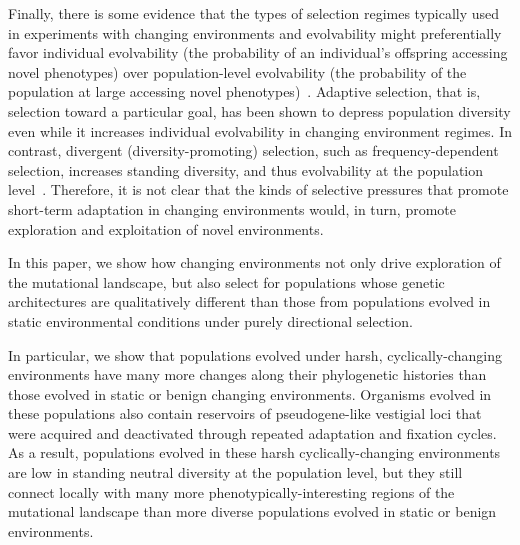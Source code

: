 \documentclass[10pt,letterpaper,final]{article}
\begin{document}
Finally, there is some evidence that the types of selection regimes typically used in experiments with changing environments and evolvability might preferentially favor individual evolvability (the probability of an individual's offspring accessing novel phenotypes) over population-level evolvability (the probability of the population at large accessing novel phenotypes)~\cite{wilder_reconciling_2015,lehman_critical_2016}. Adaptive selection, that is, selection toward a particular goal, has been shown to depress population diversity even while it increases individual evolvability in changing environment regimes. In contrast, divergent (diversity-promoting) selection, such as frequency-dependent selection, increases standing diversity, and thus evolvability at the population level~\cite{wilder_reconciling_2015}. Therefore, it is not clear that the kinds of selective pressures that promote short-term adaptation in changing environments would, in turn, promote exploration and exploitation of novel environments.




In this paper, we show how changing environments not only drive exploration of the mutational landscape, but also select for populations whose genetic architectures are qualitatively different than those from populations evolved in static environmental conditions under purely directional selection. 

In particular, we show that populations evolved under harsh, cyclically-changing environments have many more changes along their phylogenetic histories than those evolved in static or benign changing environments. Organisms evolved in these populations also contain reservoirs of pseudogene-like vestigial loci that were acquired and deactivated through repeated adaptation and fixation cycles. As a result, populations evolved in these harsh cyclically-changing environments are low in standing neutral diversity at the population level, but they still connect locally with many more phenotypically-interesting regions of the mutational landscape than more diverse populations evolved in static or benign environments.
\end{document}
